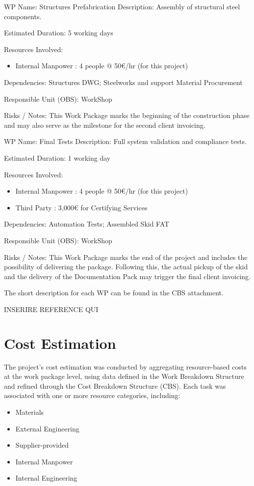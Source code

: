 \documentclass[12pt]{article}
\begin{document}
WP Name: Structures Prefabrication
Description:
Assembly of structural steel components.

Estimated Duration: 5 working days

Resources Involved:
\begin{itemize}
        \item  Internal Manpower : 4 people @ 50€/hr (for this project)
\end{itemize}

Dependencies:
Structures DWG; Steelworks and support Material Procurement

Responsible Unit (OBS): WorkShop

Risks / Notes:
This Work Package marks the beginning of the construction phase and may also serve as the milestone for the second client invoicing.

WP Name: Final Tests	
Description:
Full system validation and compliance tests.

Estimated Duration: 1 working day

Resources Involved:
\begin{itemize}
        \item  Internal Manpower : 4 people @ 50€/hr (for this project)
        \item  Third Party : 3,000€ for Certifying Services
        
\end{itemize}

Dependencies:
Automation Tests; Assembled Skid FAT

Responsible Unit (OBS): WorkShop

Risks / Notes:
This Work Package marks the end of the project and includes the possibility of delivering the package. Following this, the actual pickup of the skid and the delivery of the Documentation Pack may trigger the final client invoicing.

The short description for each WP can be found in the CBS attachment.

INSERIRE REFERENCE QUI

\section{Cost Estimation}

The project’s cost estimation was conducted by aggregating resource-based costs at the work package level, using data defined in the Work Breakdown Structure and refined through the Cost Breakdown Structure (CBS). Each task was associated with one or more resource categories, including:
\begin{itemize}
        \item Materials
        \item External Engineering
        \item Supplier-provided
        \item Internal Manpower
        \item Internal Engineering
\end{itemize}
\end{document}
